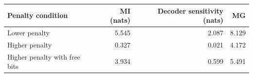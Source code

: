 \begin{tabular}{lrrr}
\toprule
Penalty condition & MI (nats) & Decoder sensitivity (nats) & MG \\
\midrule
Lower penalty & 5.545 & 2.087 & 8.129 \\
Higher penalty & 0.327 & 0.021 & 4.172 \\
Higher penalty with free bits & 3.934 & 0.599 & 5.491 \\
\bottomrule
\end{tabular}
